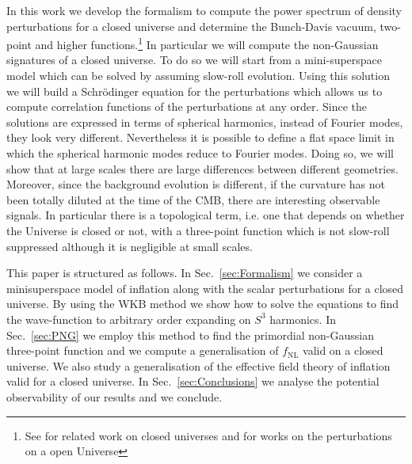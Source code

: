 \documentclass[a4paper,11pt]{article}
\numberwithin{equation}{section}
\numberwithin{equation}{section}
\begin{document}
In this work we develop the formalism to compute the power spectrum of density perturbations for a closed universe and determine the Bunch-Davis vacuum, two-point and higher functions.\footnote{See\cite{Halliwell:1984eu,Seery:2010kh, Ratra:2017ezv,Handley:2019anl,Avis:2019eav}  for related work on closed universes and  \cite{Bucher:1994gb,Yamamoto:1996qq,Sugimura:2013cra} for works on the perturbations on a open Universe} In particular we will compute the non-Gaussian signatures of a closed universe. To do so we will start from a mini-superspace model which can be solved by assuming slow-roll evolution. Using this solution we will build a Schr\"odinger equation for the perturbations which allows us to compute correlation functions of the perturbations at any order. Since the solutions are expressed in terms of spherical harmonics, instead of Fourier modes, they look very different. Nevertheless it is possible to define a flat space limit in which the spherical harmonic modes reduce to Fourier modes. Doing so, we will show that at large scales there are large differences between different geometries. Moreover, since the background evolution is different, if the curvature has not been totally diluted at the time of the CMB, there are interesting observable signals. In particular there is a topological term, i.e. one that depends on whether the Universe is closed or not,  with a three-point function which is not slow-roll suppressed although it is negligible at small scales.

This paper is structured as follows. In Sec.~\ref{sec:Formalism} we consider a minisuperspace model of inflation along with the scalar perturbations for a closed universe. By using the WKB method we show how to solve the equations to find the wave-function  to arbitrary order expanding on $S^3$ harmonics. In Sec.~\ref{sec:PNG} we employ this method to find the primordial non-Gaussian three-point function and we compute a generalisation of $f_{\mathrm{NL}}$ valid on a closed universe. We also study a generalisation of the effective field theory of inflation valid for a closed universe. In Sec.~\ref{sec:Conclusions} we analyse the potential observability of our results and we conclude. 
\end{document}
